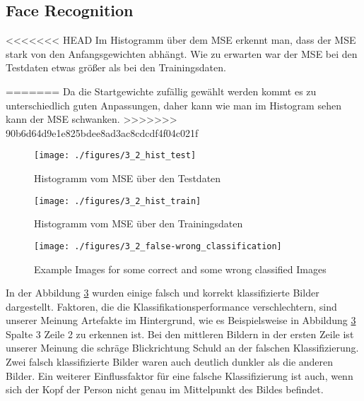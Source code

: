 \subsection{Face Recognition}

<<<<<<< HEAD
Im Histogramm über dem MSE erkennt man, dass der MSE stark von den Anfangsgewichten abhängt.
Wie zu erwarten war der MSE bei den Testdaten etwas größer als bei den Trainingsdaten.

=======
Da die Startgewichte zufällig gewählt werden kommt es zu unterschiedlich guten Anpassungen, daher kann wie man im Histogram sehen kann der MSE schwanken.
>>>>>>> 90b6d64d9e1e825bdee8ad3ac8cdcdf4f04c021f



\begin{figure}[hp!]
\begin{center}
 \texttt{[image: ./figures/3\_2\_hist\_test]}
 \caption{Histogramm vom MSE über den Testdaten}
\label{fig:face_false_wrong}
\end{center}
\end{figure}

\begin{figure}[hp!]
\begin{center}
 \texttt{[image: ./figures/3\_2\_hist\_train]}
 \caption{Histogramm vom MSE über den Trainingsdaten}
\label{fig:face_false_wrong}
\end{center}
\end{figure}



\begin{figure}[hp!]
\begin{center}
 \texttt{[image: ./figures/3\_2\_false-wrong\_classification]}
 \caption{Example Images for some correct and some wrong classified Images}
\label{fig:face_false_wrong}
\end{center}
\end{figure}

In der Abbildung \ref{fig:face_false_wrong} wurden einige falsch und korrekt klassifizierte Bilder dargestellt.
Faktoren, die die Klassifikationsperformance verschlechtern, sind unserer Meinung Artefakte im Hintergrund, wie 
es Beispielsweise in Abbildung \ref{fig:face_false_wrong} Spalte 3 Zeile 2 zu erkennen ist.
Bei den mittleren Bildern in der ersten Zeile ist unserer Meinung die schräge Blickrichtung Schuld an der falschen
Klassifizierung. Zwei falsch klassifizierte Bilder waren auch deutlich dunkler als die anderen Bilder. Ein weiterer
Einflussfaktor für eine falsche Klassifizierung ist auch, wenn sich der Kopf der Person nicht genau im Mittelpunkt
des Bildes befindet.


